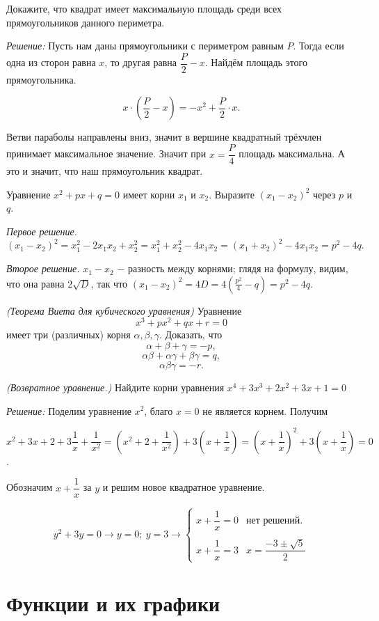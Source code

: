 Докажите, что квадрат имеет максимальную площадь среди всех прямоугольников данного периметра.

\textit{Решение:} Пусть нам даны прямоугольники с периметром равным $P$. Тогда если одна из сторон равна $x$, то другая равна $\dfrac{P}{2} - x$. Найдём площадь этого прямоугольника. 

\[x\cdot (\dfrac{P}{2} - x) = -x^2 +\dfrac{P}{2} \cdot x.\]

Ветви параболы направлены вниз, значит в вершине квадратный трёхчлен принимает максимальное значение. Значит при $x = \dfrac{P}{4}$ площадь максимальна. А это и значит, что наш прямоугольник квадрат.

Уравнение \(x^2 + px + q = 0\) имеет корни \(x_1\) и \(x_2\). Выразите \((x_1 - x_2)^2\) через \(p\) и \(q\).

\textit{Первое решение.} \((x_1 - x_2)^2 = x_1^2 - 2x_1x_2 + x_2^2 = x_1^2 + x_2^2 - 4x_1x_2 = (x_1 + x_2)^2 - 4x_1x_2 = p^2 - 4q.\)

\textit{Второе решение.} \(x_1 - x_2\) $-$ разность между корнями; глядя на формулу, видим, что она равна \(2\sqrt{D}\), так что \((x_1 - x_2)^2 = 4D = 4 \left( \frac{p^2}{4} - q \right) = p^2 - 4q.\)

\textit{(Теорема Виета для кубического уравнения)} Уравнение
\[
x^3 + px^2 + qx + r = 0
\]
имеет три (различных) корня \(\alpha, \beta, \gamma\). Доказать, что
\[
\alpha + \beta + \gamma = -p,
\]
\[
\alpha \beta + \alpha \gamma + \beta \gamma = q,
\]
\[
\alpha \beta \gamma = -r.
\]


 \textit{(Возвратное уравнение.)} Найдите корни уравнения $x^4 + 3x^3 + 2x^2 + 3x + 1 = 0$

\textit{Решение:} Поделим уравнение $x^2$, благо $x=0$ не является корнем. Получим 

\[ x^2 + 3x + 2 + 3\dfrac{1}{x} + \dfrac{1}{x^2} = (x^2 + 2 + \dfrac{1}{x^2}) + 3 (x+\dfrac{1}{x}) = (x+\dfrac{1}{x})^2 + 3(x+\dfrac{1}{x}) = 0\].

Обозначим $x + \dfrac{1}{x}$ за $y$ и решим новое квадратное уравнение.

\[y^2 + 3y = 0 \to y = 0; \ y = 3 \to  
\begin{cases}
   x+\dfrac{1}{x} = 0 &\text{нет решений.}\\
   \\
   x + \dfrac{1}{x} = 3 & x = \dfrac{-3 \pm \sqrt{5}}{2}
 \end{cases}
 \]

 \section{Функции и их графики}

